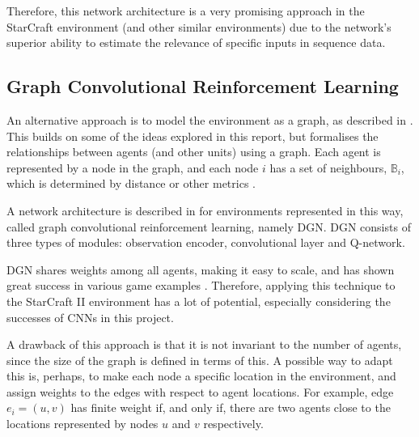 Therefore, this network architecture is a very promising approach in the StarCraft environment (and other similar environments) due to the network's superior ability to estimate the relevance of specific inputs in sequence data.


\subsection{Graph Convolutional Reinforcement Learning}

An alternative approach is to model the environment as a graph, as described in \cite{graph}. This builds on some of the ideas explored in this report, but formalises the relationships between agents (and other units) using a graph. Each agent is represented by a node in the graph, and each node $i$ has a set of neighbours, $\mathbb{B}_i$, which is determined by distance or other metrics \cite{graph}.

A network architecture is described in \cite{graph} for environments represented in this way, called graph  convolutional reinforcement learning, namely DGN. DGN consists of three types of modules:  observation encoder, convolutional layer and Q-network. 

DGN shares weights among all agents, making it easy to scale, and has shown great success in various game examples \cite{graph}. Therefore, applying this technique to the StarCraft II environment has a lot of potential, especially considering the successes of CNNs in this project. 

A drawback of this approach is that it is not invariant to the number of agents, since the size of the graph is defined in terms of this. A possible way to adapt this is, perhaps, to make each node a specific location in the environment, and assign weights to the edges with respect to agent locations. For example, edge $e_i = (u,v)$ has finite weight if, and only if, there are two agents close to the locations represented by nodes $u$ and $v$ respectively.



